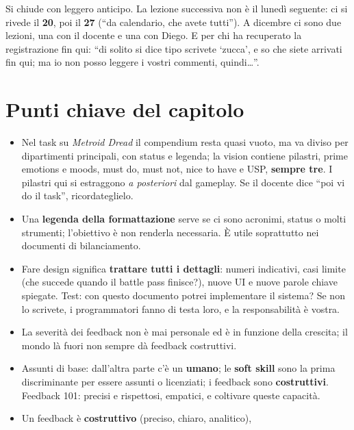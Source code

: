 Si chiude con leggero anticipo. La lezione successiva non è il lunedì
seguente: ci si rivede il \textbf{20}, poi il \textbf{27} (``da calendario,
che avete tutti''). A dicembre ci sono due lezioni, una con il docente e una
con Diego. E per chi ha recuperato la registrazione fin qui: ``di solito si
dice tipo scrivete `zucca', e so che siete arrivati fin qui; ma io non posso
leggere i vostri commenti, quindi\ldots''.

\section*{Punti chiave del capitolo}

\begin{itemize}
  \item Nel task su \emph{Metroid Dread} il compendium resta quasi vuoto, ma
        va diviso per dipartimenti principali, con status e legenda; la
        vision contiene pilastri, prime emotions e moods, must do, must not,
        nice to have e USP, \textbf{sempre tre}. I pilastri qui si estraggono
        \emph{a posteriori} dal gameplay. Se il docente dice ``poi vi do il
        task'', ricordateglielo.
  \item Una \textbf{legenda della formattazione} serve se ci sono acronimi,
        status o molti strumenti; l'obiettivo è non renderla necessaria. È
        utile soprattutto nei documenti di bilanciamento.
  \item Fare design significa \textbf{trattare tutti i dettagli}: numeri
        indicativi, casi limite (che succede quando il battle pass finisce?),
        nuove UI e nuove parole chiave spiegate. Test: con questo documento
        potrei implementare il sistema? Se non lo scrivete, i programmatori
        fanno di testa loro, e la responsabilità è vostra.
  \item La severità dei feedback non è mai personale ed è in funzione della
        crescita; il mondo là fuori non sempre dà feedback costruttivi.
  \item Assunti di base: dall'altra parte c'è un \textbf{umano};
        le \textbf{soft skill} sono la prima discriminante per essere assunti
        o licenziati; i feedback sono \textbf{costruttivi}. Feedback 101:
        precisi e rispettosi, empatici, e coltivare queste capacità.
  \item Un feedback è \textbf{costruttivo} (preciso, chiaro, analitico),

\end{itemize}
